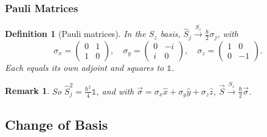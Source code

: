 \documentclass{article}
\newtheorem{definition}{Definition}
\newtheorem{remark}{Remark}
\newcommand{\id}{\mathds{1}}
\begin{document}
\subsubsection{Pauli Matrices}
\begin{definition}[Pauli matrices]
    In the $S_z$ basis, $\hat{S}_j \xrightarrow{S_z} \frac{\hbar}{2}\sigma_j$, with
    \begin{equation}
        \sigma_x = \begin{pmatrix} 0 & 1 \\ 1 & 0 \end{pmatrix}, \quad
        \sigma_y = \begin{pmatrix} 0 & -i \\ i & 0 \end{pmatrix}, \quad
        \sigma_z = \begin{pmatrix} 1 & 0 \\ 0 & -1 \end{pmatrix}.
    \end{equation}
    Each equals its own adjoint and squares to $\id$.
\end{definition}
\begin{remark}
    So $\hat{S}_j^2 = \tfrac{\hbar^2}{4}\id$, and with $\vec{\sigma} = \sigma_x\hat{x} + \sigma_y\hat{y} + \sigma_z\hat{z}$, $\vec{S} \xrightarrow{S_z} \frac{\hbar}{2}\vec{\sigma}$.
\end{remark}

\subsection{Change of Basis}
\label{sec:change-basis}
\end{document}

